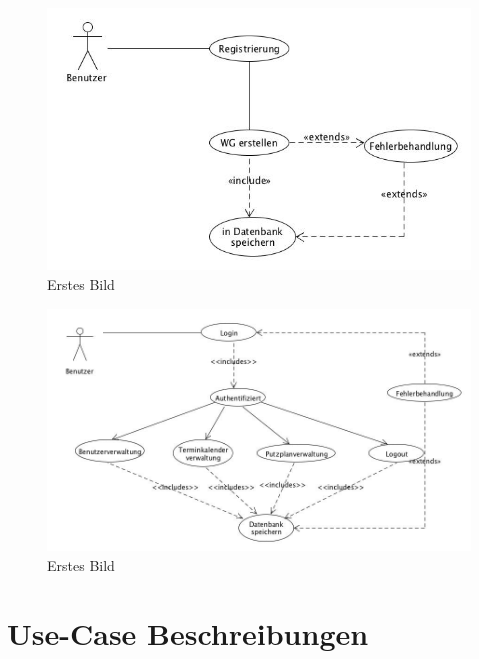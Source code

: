 \begin{figure}[H] 
  \centering
     \includegraphics[width=\textwidth]{anhang/usecases/diagramme/teamprojekt14_uc_Registrierung.jpg}
  \caption{Erstes Bild}
  \label{fig:Bild1}
\end{figure}

\begin{figure}[H] 
  \centering
     \includegraphics[width=\textwidth]{anhang/usecases/diagramme/teamprojekt14_uc_WebLogin.jpg}
  \caption{Erstes Bild}
  \label{fig:Bild1}
\end{figure}
\newpage

\section{Use-Case Beschreibungen}



 
% 

